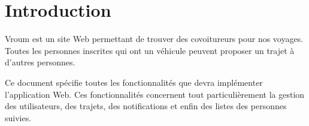 \chapter{Introduction}


Vroum est un site Web permettant de trouver des covoitureurs pour nos voyages.
Toutes les personnes inscrites qui ont un véhicule peuvent proposer un trajet à d'autres personnes.

\vspace{1cm}

Ce document spécifie toutes les fonctionnalités que devra implémenter l'application Web.
Ces fonctionnalités concernent tout particulièrement la gestion des utilisateurs, des trajets, des notifications et enfin des listes des personnes suivies.
